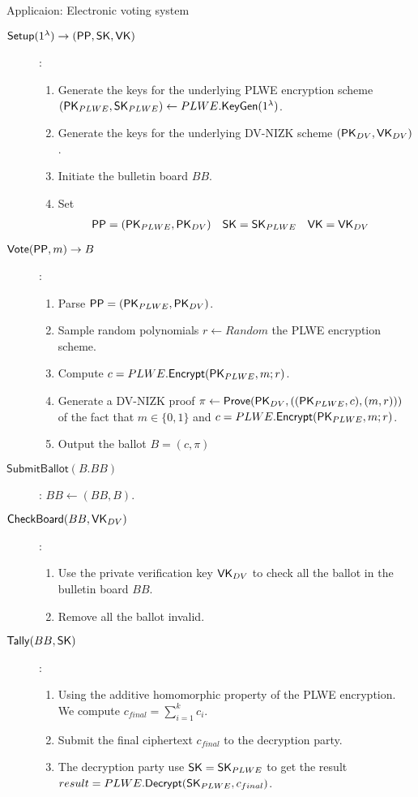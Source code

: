 \begin{section}{Applicaion: Electronic voting system}
  \begin{description}
    \item[$\mathsf{Setup}(1^\lambda) \to ( {\mathsf{PP}}, \mathsf{SK}, \mathsf{VK})$]:
    \begin{enumerate}
      \item Generate the keys for the underlying PLWE encryption scheme $(\mathsf{PK}_{PLWE}, \mathsf{SK}_{PLWE}) \gets PLWE.{\mathsf{KeyGen}}(1^\lambda)$.
      \item Generate the keys for the underlying DV-NIZK scheme $(\mathsf{PK}_{DV}, \mathsf{VK}_{DV})$.
      \item Initiate the bulletin board $BB$.
      \item Set
      \begin{align*}
        {\mathsf{PP}} &= (\mathsf{PK}_{PLWE}, \mathsf{PK}_{DV}) & \mathsf{SK} &= \mathsf{SK}_{PLWE} & \mathsf{VK} &= \mathsf{VK}_{DV}
      \end{align*}
    \end{enumerate}
    \item[$\mathsf{Vote}({\mathsf{PP}}, m) \to B$]:
    \begin{enumerate}
      \item Parse ${\mathsf{PP}} = (\mathsf{PK}_{PLWE}, \mathsf{PK}_{DV})$.
      \item Sample random polynomials $r \gets Random$ \wrt the PLWE encryption scheme.
      \item Compute $c = PLWE.{\mathsf{Encrypt}}(\mathsf{PK}_{PLWE}, m; r)$.
      \item Generate a DV-NIZK proof $\pi \gets {\mathsf{Prove}}(\mathsf{PK}_{DV}, ((\mathsf{PK}_{PLWE}, c), (m, r)))$ of the fact that $m \in \{0,1\}$ and $c = PLWE.{\mathsf{Encrypt}}(\mathsf{PK}_{PLWE}, m; r)$.
      \item Output the ballot $B = (c, \pi)$
    \end{enumerate}
    \item[$\mathsf{SubmitBallot}(B. BB)$]: $BB \gets (BB, B)$.
    \item[$\mathsf{CheckBoard}(BB, \mathsf{VK}_{DV})$]:
    \begin{enumerate}
      \item Use the private verification key $\mathsf{VK}_{DV}$ to check all the ballot in the bulletin board $BB$.
      \item Remove all the ballot invalid.
    \end{enumerate}
    \item[$\mathsf{Tally}(BB, \mathsf{SK})$]:
    \begin{enumerate}
      \item Using the additive homomorphic property of the PLWE encryption. We compute $c_{final} = \sum_{i = 1}^k c_i$.
      \item Submit the final ciphertext $c_{final}$ to the decryption party.
      \item The decryption party use $\mathsf{SK} = \mathsf{SK}_{PLWE}$ to get the result $result = PLWE.{\mathsf{Decrypt}}(\mathsf{SK}_{PLWE}, c_{final})$.
    \end{enumerate}
  \end{description}
\end{section}

